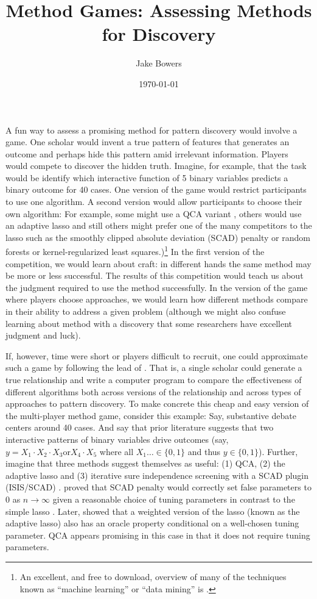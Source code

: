 \documentclass[12pt]{article}
\title{Method Games: Assessing Methods for Discovery}
\author{Jake Bowers}
\date{\today}
\begin{document}
\maketitle

A fun way to assess a promising method for pattern discovery would involve a
game.  One scholar would invent a true pattern of features that generates an
outcome and perhaps hide this pattern amid irrelevant information.  Players
would compete to discover the hidden truth.  Imagine, for example, that the
task would be identify which interactive function of 5 binary variables
predicts a binary outcome for 40 cases.   One version of the game would
restrict participants to use one algorithm. A second version would allow
participants to choose their own algorithm: For example, some might use a QCA
variant \citep{rihoux2008configurational}, others would use an adaptive lasso
\citep{zou2006adaptive} and still others might prefer one of the many
competitors to the lasso such as the smoothly clipped absolute deviation (SCAD)
penalty \citep{fan2001variable} or random forests \citep{breiman2001random} or
kernel-regularized least squares\citep{}.)\footnote{An excellent, and free to
	download, overview of many of the techniques known as ``machine learning'' or
	``data mining'' is \citet{hiddenastie2005elements}.} In the first version of
the competition, we would learn about craft: in different hands the same method
may be more or less successful. The results of this competition would 
teach us about the judgment required to use the method successfully.  In the
version of the game where players choose approaches, we would learn how different methods compare
in their ability to address a given problem (although we might also confuse
learning about method with a discovery that some researchers have excellent
judgment and luck).

If, however, time were short or players difficult to recruit, one could
approximate such a game by following the lead of \citet{lucasfk2013}. That is,
a single scholar could generate a true relationship and write a computer
program to compare the effectiveness of different algorithms both across
versions of the relationship and across types of approaches to pattern
discovery. To make concrete this cheap and easy version of the multi-player
method game, consider this example: Say, substantive debate centers around 40
cases. And say that prior literature suggests that two interactive patterns of
binary variables drive outcomes (say, $y=X_1 \cdot X_2 \cdot X_3 \text{or} X_4
\cdot X_5$ where all $X_1 \ldots  \in \{0,1\}$ and thus $y \in \{0,1\}$).
Further, imagine that three methods suggest themselves as useful: (1) QCA, (2)
the adaptive lasso and (3) iterative sure independence screening with a SCAD
plugin (ISIS/SCAD) \cite{fan2008sure}.  \cite{fan2001variable} proved that
SCAD penalty would correctly set false parameters to 0 as $n \rightarrow
\infty$ given a reasonable choice of tuning parameters in contrast to the
simple lasso \cite{tibshirani1996regression}.  Later, \citet{zou2006adaptive}
showed that a weighted version of the lasso (known as the adaptive lasso) also
has an oracle property conditional on a well-chosen tuning parameter. QCA
appears promising in this case in that it does not require tuning parameters.
\end{document}
